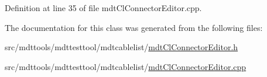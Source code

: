 Definition at line 35 of file mdt\-Cl\-Connector\-Editor.\-cpp.



The documentation for this class was generated from the following files\-:\begin{DoxyCompactItemize}
\item 
src/mdttools/mdttesttool/mdtcablelist/\hyperlink{mdt_cl_connector_editor_8h}{mdt\-Cl\-Connector\-Editor.\-h}\item 
src/mdttools/mdttesttool/mdtcablelist/\hyperlink{mdt_cl_connector_editor_8cpp}{mdt\-Cl\-Connector\-Editor.\-cpp}\end{DoxyCompactItemize}
